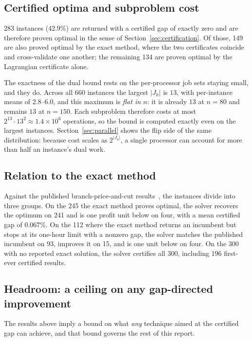 \documentclass[11pt,a4paper]{article}
\begin{document}
\subsection{Certified optima and subproblem cost}\label{sec:subproblem-size}

283 instances (42.9\%) are returned with a certified gap of exactly zero and are
therefore proven optimal in the sense of Section~\ref{sec:certification}. Of
those, 149 are also proved optimal by the exact method, where the two certificates
coincide and cross-validate one another; the remaining 134 are proven optimal by
the Lagrangian certificate alone.

The exactness of the dual bound rests on the per-processor job sets staying small,
and they do. Across all 660 instances the largest $|J_k|$ is $13$, with
per-instance means of $2.8$--$6.0$, and this maximum is \emph{flat in $n$}: it is
already $13$ at $n=80$ and remains $13$ at $n=150$. Each subproblem therefore
costs at most $2^{13}\cdot 13^2\approx 1.4\times10^{6}$ operations, so the bound is
computed exactly even on the largest instances. Section~\ref{sec:parallel} shows
the flip side of the same distribution: because cost scales as $2^{|J_k|}$, a
single processor can account for more than half an instance's dual work.

\subsection{Relation to the exact method}

Against the published branch-price-and-cut
results~\cite{RieraLedesma2021SRPS}, the instances divide into three groups. On
the 245 the exact method proves optimal, the solver recovers the optimum on 241
and is one profit unit below on four, with a mean certified gap of 0.067\%. On the
112 where the exact method returns an incumbent but stops at its one-hour limit
with a nonzero gap, the solver matches the published incumbent on 93, improves it
on 15, and is one unit below on four. On the 300 with no reported exact solution,
the solver certifies all 300, including 196 first-ever certified results.

\subsection{Headroom: a ceiling on any gap-directed improvement}\label{sec:ceiling}

The results above imply a bound on what \emph{any} technique aimed at the
certified gap can achieve, and that bound governs the rest of this report.
\end{document}
